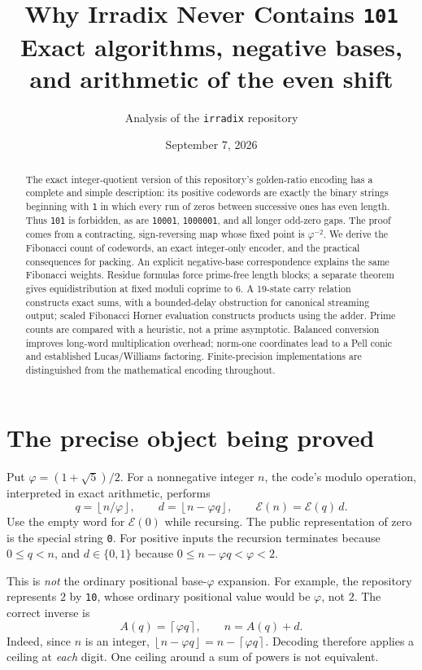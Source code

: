 \documentclass[11pt]{article}
\title{Why Irradix Never Contains \texttt{101}\\[5pt]
\large Exact algorithms, negative bases, and arithmetic of the even shift}
\author{Analysis of the \texttt{irradix} repository}
\date{September 7, 2026}
\theoremstyle{definition}\newtheorem{definition}[theorem]{Definition}
\newcommand{\ph}{\varphi}
\newcommand{\fl}[1]{\left\lfloor #1\right\rfloor}
\newcommand{\cl}[1]{\left\lceil #1\right\rceil}
\newcommand{\E}{\mathcal E}
\begin{document}
\maketitle
\begin{abstract}
The exact integer-quotient version of this repository's golden-ratio
encoding has a complete and simple description: its positive codewords
are exactly the binary strings beginning with \texttt{1} in which every
run of zeros between successive ones has even length. Thus \texttt{101}
is forbidden, as are \texttt{10001}, \texttt{1000001}, and all longer
odd-zero gaps. The proof comes from a contracting, sign-reversing map
whose fixed point is $\ph^{-2}$. We derive the Fibonacci count of
codewords, an exact integer-only encoder, and the practical consequences
for packing. An explicit negative-base correspondence explains the same
Fibonacci weights. Residue formulas force prime-free length blocks;
a separate theorem gives equidistribution at fixed moduli coprime to 6.
A 19-state carry relation constructs exact sums, with a bounded-delay
obstruction for canonical streaming output; scaled Fibonacci Horner
evaluation constructs products using the adder. Prime counts are compared
with a heuristic, not a prime asymptotic. Balanced conversion improves
long-word multiplication overhead; norm-one coordinates lead to a
Pell conic and established Lucas/Williams factoring.
Finite-precision implementations are distinguished from
the mathematical encoding throughout.
\end{abstract}

\section{The precise object being proved}
Put $\ph=(1+\sqrt5)/2$. For a nonnegative integer $n$, the code's
modulo operation, interpreted in exact arithmetic, performs
\begin{equation}\label{eq:forward}
q=\fl{n/\ph},\qquad d=\fl{n-\ph q},\qquad
\E(n)=\E(q)\,d.
\end{equation}
Use the empty word for $\E(0)$ while recursing. The public representation
of zero is the special string \texttt{0}. For positive inputs the recursion
terminates because $0\le q<n$, and $d\in\{0,1\}$ because
$0\le n-\ph q<\ph<2$.

This is \emph{not} the ordinary positional base-$\ph$ expansion.
For example, the repository represents $2$ by \texttt{10}, whose ordinary
positional value would be $\ph$, not $2$. The correct inverse is
\begin{equation}\label{eq:inverse}
A(q)=\cl{\ph q},\qquad n=A(q)+d.
\end{equation}
Indeed, since $n$ is an integer,
$\fl{n-\ph q}=n-\cl{\ph q}$. Decoding therefore applies a ceiling
at \emph{each} digit. One ceiling around a sum of powers is not equivalent.
\end{document}
